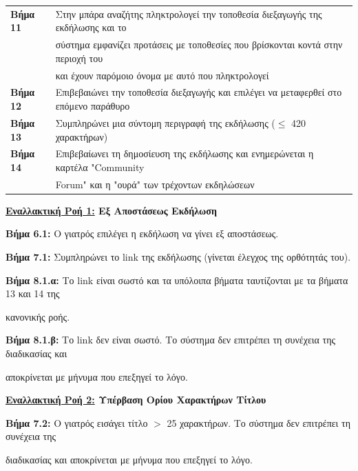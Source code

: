 \documentclass{article}
\newcommand\T{\rule{0pt}{2.6ex}}       %
\newcommand\B{\rule[-1.2ex]{0pt}{0pt}}
\begin{document}
\begin{center}
\begin{tabular}{|l|l|}
      \hline
       \textbf{Βήμα 11} & Στην μπάρα αναζήτης πληκτρολογεί την τοποθεσία διεξαγωγής της εκδήλωσης και το \T \\& σύστημα εμφανίζει προτάσεις με τοποθεσίες που βρίσκονται κοντά στην περιοχή του \\& και έχουν παρόμοιο όνομα με αυτό που πληκτρολογεί \B \\
      \hline
       \textbf{Βήμα 12} & Επιβεβαιώνει την τοποθεσία διεξαγωγής και επιλέγει να μεταφερθεί στο επόμενο παράθυρο\T\B \\
      \hline
       \textbf{Βήμα 13} & Συμπληρώνει μια σύντομη περιγραφή της εκδήλωσης ($\le$ 420 χαρακτήρων) \T\B \\
      \hline
       \textbf{Βήμα 14} & Επιβεβαίωνει τη δημοσίευση της εκδήλωσης και ενημερώνεται η καρτέλα "Community \T \\& Forum" και η "ουρά" των τρέχοντων εκδηλώσεων \B \\
      \hline
     \end{tabular}
 \end{center}
 
  \textbf{\underline{Εναλλακτική Ροή 1:} Εξ Αποστάσεως Εκδήλωση} \vspace{0.2cm}
\par \textbf{Βήμα 6.1:} Ο γιατρός επιλέγει η εκδήλωση να γίνει εξ αποστάσεως.\vspace{0.1cm}

\par\textbf{Βήμα 7.1:} Συμπληρώνει το link της εκδήλωσης (γίνεται έλεγχος της ορθότητάς του). \vspace{0.1cm}
\par \textbf{Βήμα 8.1.α:} Το link είναι σωστό και τα υπόλοιπα βήματα ταυτίζονται με τα βήματα 13 και 14 της \par κανονικής ροής. \vspace{0.2cm}
\par \textbf{Βήμα 8.1.β:} Το link δεν είναι σωστό. Το σύστημα δεν επιτρέπει τη συνέχεια της διαδικασίας και \par αποκρίνεται με μήνυμα που επεξηγεί το λόγο. \vspace{0.2cm}

\textbf{\underline{Εναλλακτική Ροή 2:} Υπέρβαση Ορίου Χαρακτήρων Τίτλου} \vspace{0.2cm}
\par \textbf{Βήμα 7.2:} Ο γιατρός εισάγει τίτλο $>$ 25 χαρακτήρων. Το σύστημα δεν επιτρέπει τη συνέχεια της \par διαδικασίας και αποκρίνεται με μήνυμα που επεξηγεί το λόγο. \vspace{0.2cm}
\end{document}
